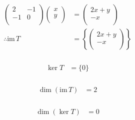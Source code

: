 \documentclass[fleqn, a4paper]{amsart}
\theoremstyle{definition}
\theoremstyle{theorem}
\theoremstyle{remark}
\newcommand{\im}{\mathrm{im}\,}
\numberwithin{corollary}{theorem}
\numberwithin{equation}{theorem}
\begin{document}
\begin{multicols}{1}
\subsubsection{}

\begin{align*}
		\begin{pmatrix}
			2 & -1\\
			-1 & 0\\
		\end{pmatrix}
		\begin{pmatrix}
			x\\
			y\\
		\end{pmatrix}
	&=
		\begin{pmatrix}
			2x + y\\
			-x\\
		\end{pmatrix}\\
	\therefore \im T & = 
		\left\lbrace
			\begin{pmatrix}
				2x + y\\
				-x\\
			\end{pmatrix}
		\right\rbrace
\end{align*}

\subsubsection{}

\begin{align*}
	\ker T &= \{0\}
\end{align*}

\subsubsection{}

\begin{align*}
	\dim (\im T) &= 2
\end{align*}

\subsubsection{}

\begin{align*}
	\dim (\ker T) &= 0
\end{align*}

\subsubsection{}


\end{multicols}
\end{document}

